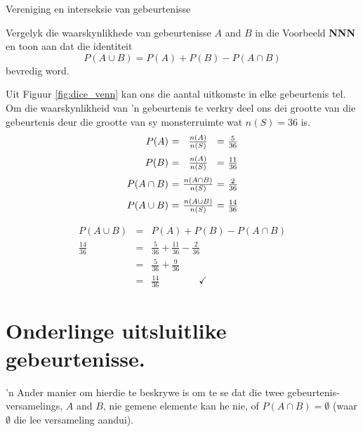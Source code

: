 \begin{wex}{Vereniging en interseksie van gebeurtenisse}{
  Vergelyk die waarskynlikhede van gebeurtenisse $A$ and $B$ in die Voorbeeld \textbf{NNN} en toon aan dat die identiteit 
\[P(A \cup B) = P(A) + P(B) - P(A \cap B)\]
bevredig word.

}{
  
Uit Figuur \ref{fig:dice_venn} kan ons die aantal uitkomste in elke gebeurtenis tel. Om die waarskynlikheid van 'n gebeurtenis te verkry deel ons dei grootte van die gebeurtenis deur die grootte van sy monsterruimte wat $n(S)=36$ is.
  \[\begin{array}{r@{$\ =\ $}c@{$\ =\ $}l}
    P(A)        & \frac{n(A)}{n(S)}        & \frac{5}{36}  \\[8pt]
    P(B)        & \frac{n(A)}{n(S)}        & \frac{11}{36} \\[8pt]
    P(A \cap B) & \frac{n(A \cap B)}{n(S)} & \frac{2}{36}  \\[8pt]
    P(A \cup B) & \frac{n(A \cup B)}{n(S)} & \frac{14}{36}
  \end{array}\]


  \begin{eqnarray*}
    P(A \cup B) &=& P(A) + P(B) - P(A \cap B) \\
    \frac{14}{36} &=& \frac{5}{36} + \frac{11}{36} - \frac{2}{36} \\
    &=& \frac{5}{36} + \frac{9}{36} \\
    &=& \frac{14}{36} \qquad\qquad\checkmark
  \end{eqnarray*}
}
\end{wex}

\section{Onderlinge uitsluitlike gebeurtenisse.}

'n Ander manier om hierdie te beskrywe is om te se dat die twee gebeurtenis-versamelings, $A$ and $B$, nie gemene elemente kan he nie, of $P(A \cap B) = \emptyset$
(waar $\emptyset$ die lee versameling aandui).


